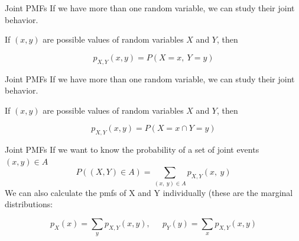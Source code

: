 \documentclass{beamer}
\numberwithin{equation}{section}
\begin{document}



\begin{frame}{Joint PMFs}
If we have more than one random variable, we can study their joint behavior.

If $(x,y)$ are possible values of random variables $X$ and $Y$, then 

$$p_{X,Y}(x, y)=P(X=x,\ Y=y)$$

\end{frame}

\begin{frame}{Joint PMFs}
If we have more than one random variable, we can study their joint behavior.

If $(x,y)$ are possible values of random variables $X$ and $Y$, then 

$$p_{X,Y}(x, y)=P(X=x \cap Y=y)$$

\end{frame}

\begin{frame}{Joint PMFs}
If we want to know the probability of a set of joint events $(x, y) \in A$
$$P((X,Y)\in A)=\sum_{(x,\ y)\in A} p_{X,Y} (x,\ y)$$
We can also calculate the pmfs of X and Y individually (these are the marginal distributions:

$$p_X(x)=\sum_y p_{X,Y}(x, y), \ \ \quad p_Y(y)=\sum_x p_{X,Y}(x, y)$$

\end{frame}
\end{document}
